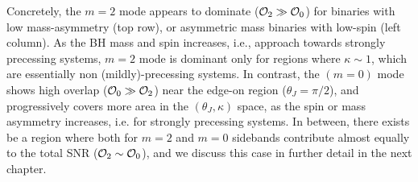 Concretely, the $m=2$ mode appears to dominate (${\cal O}_2 \gg {\cal O}_0$)
for binaries with low mass-asymmetry (top row), or asymmetric mass binaries
with low-spin (left column). As the BH mass and spin increases, i.e., approach
towards strongly precessing systems, $m=2$ mode is dominant only for regions
where $\kappa \sim 1$, which are essentially non (mildly)-precessing systems.
In contrast, the $(m=0)$ mode shows high overlap (${\cal O}_0 \gg {\cal O}_2$)
near the edge-on region ($\theta_J=\pi/2$), and progressively covers more area
in the $(\theta_J, \kappa)$ space, as the spin or mass asymmetry increases,
i.e. for strongly precessing systems. In between, there exists be a region
where both for $m=2$ and $m=0$ sidebands contribute almost equally to the
total SNR (${\cal O}_2 \sim {\cal O}_0$), and we discuss this case in further
detail in the next chapter.


